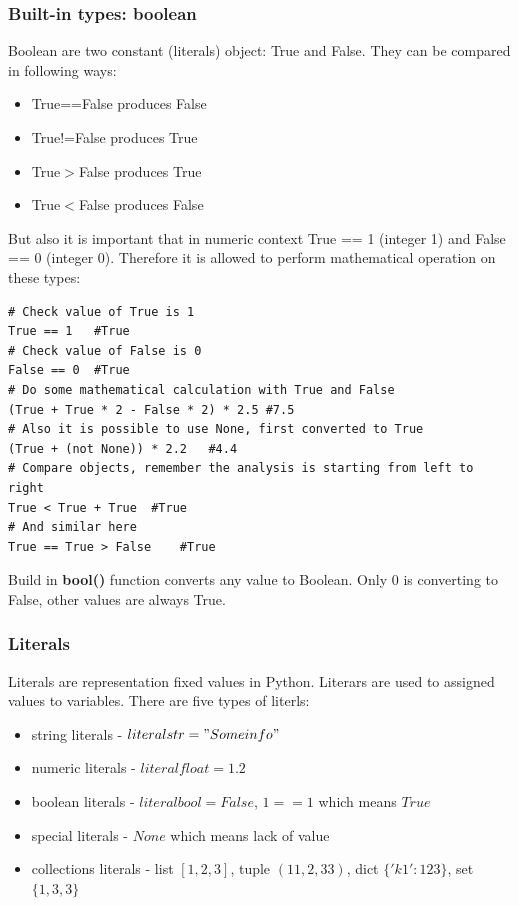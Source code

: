 \documentclass{article}
\begin{document}
	\subsubsection{Built-in types: boolean}
	Boolean are two constant (literals) object: True and False. They can be compared in following ways:
	\begin{itemize}
	\item True==False produces False
	\item True!=False produces True
	\item True$>$False produces True
	\item True$<$False produces False
	\end{itemize}
	But also it is important that in numeric context True  == 1 (integer 1) and False == 0 (integer 0). Therefore it is allowed to perform mathematical operation on these types:
\begin{lstlisting}[style=pystyle]
# Check value of True is 1
True == 1	#True
# Check value of False is 0
False == 0	#True
# Do some mathematical calculation with True and False
(True + True * 2 - False * 2) * 2.5	#7.5
# Also it is possible to use None, first converted to True
(True + (not None)) * 2.2	#4.4
# Compare objects, remember the analysis is starting from left to right
True < True + True	#True
# And similar here
True == True > False	#True
\end{lstlisting}
	Build in \textbf{bool()} function converts any value to Boolean. Only 0 is converting to False, other values are always True.
	
	\subsubsection{Literals}
	Literals are representation fixed values in Python. Literars are used to assigned values to variables. There are five types of literls:
	\begin{itemize}
	\item string literals - $literalstr="Some info"$
	\item numeric literals - $literalfloat=1.2$
	\item boolean literals - $literalbool=False$, $1==1$ which means $True$
	\item special literals - $None$ which means lack of value
	\item collections literals - list $[1,2,3]$, tuple $(11,2,33)$, dict $\{'k1': 123\}$, set $\{1, 3, 3\}$ 	
	\end{itemize}
	
\end{document}
